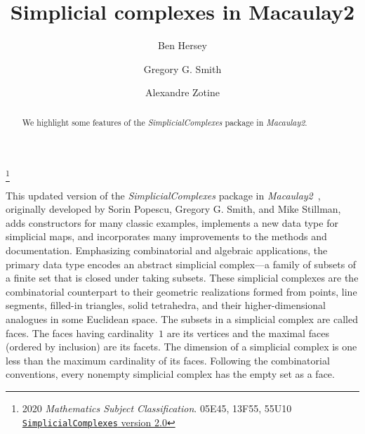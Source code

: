 \documentclass[12pt,leqno]{amsart}
\theoremstyle{definition}
\begin{document}
\vspace*{-4.5em}

\title[Simplicial Complexes]{Simplicial complexes in Macaulay2}

\author[B.~Hersey]{Ben Hersey}
\author[G.G.~Smith]{Gregory G.{} Smith} 
\author[A.~Zotine]{Alexandre Zotine}

\address{Department of Mathematics and Statistics, Queen's
  University, Kingston, Ontario, K7L 3N6
  {\normalfont\texttt{hersey.b@queensu.ca}},
  {\normalfont\texttt{ggsmith@mast.queensu.ca}},
  {\normalfont\texttt{18az45@queensu.ca}}.
}

\thanks{2020 \emph{Mathematics Subject Classification}. 05E45, 13F55,
  55U10\\
  \indent
  \href{http://www2.macaulay2.com/Macaulay2/doc/Macaulay2-1.20/share/doc/Macaulay2/SimplicialComplexes/html/index.html}{\texttt{SimplicialComplexes} version 2.0}}

\begin{abstract}
  We highlight some features of the \emph{SimplicialComplexes} package in
  \emph{Macaulay2}.
\end{abstract}

\maketitle

\vspace{-0.5em}

\noindent
This updated version of the \emph{SimplicialComplexes} package in
\emph{Macaulay2}~\cite{M2}, originally developed by Sorin Popescu, Gregory
G. Smith, and Mike Stillman, adds constructors for many classic examples,
implements a new data type for simplicial maps, and incorporates many
improvements to the methods and documentation.  Emphasizing combinatorial and
algebraic applications, the primary data type encodes an abstract simplicial
complex---a family of subsets of a finite set that is closed under taking subsets.  These
simplicial complexes are the combinatorial counterpart to their geometric
realizations formed from points, line segments, filled-in triangles, solid
tetrahedra, and their higher-dimensional analogues in some Euclidean space.
The subsets in a simplicial complex are called faces. The faces having
cardinality~$1$ are its vertices and the maximal faces (ordered by inclusion)
are its facets.  The dimension of a simplicial complex is one less than the
maximum cardinality of its faces. Following the combinatorial conventions,
every nonempty simplicial complex has the empty set as a face.
\end{document}
